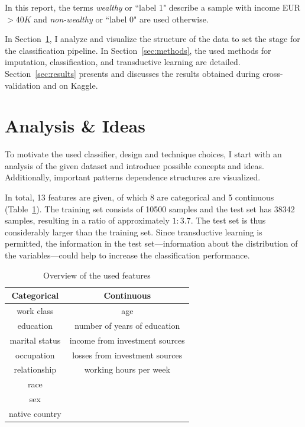 \documentclass{article}
\begin{document}
In this report, the terms \emph{wealthy} or ``label 1" describe a sample with income EUR $>40K$ and \emph{non-wealthy} or ``label 0" are used otherwise.

In Section~\ref{sec:analysis}, I analyze and visualize
the structure of the data to set the stage for the classification pipeline. In
Section~\ref{sec:methods}, the used methods for imputation, classification, and transductive learning are detailed. Section~\ref{sec:results} presents and discusses the results obtained during cross-validation and on
Kaggle.

\section{Analysis \& Ideas}
\label{sec:analysis}

To motivate the used classifier, design and technique
choices, I start with an analysis of the given dataset and introduce possible concepts and ideas. Additionally, important patterns dependence structures are visualized.

In total, 13 features are given, of which 8 are categorical and 5 continuous (Table~\ref{tab:features}).
The training set consists of 10500 samples and the test set has 38342 samples, resulting in a ratio of approximately $1:3.7$.
The test set is thus considerably larger than the training set.
Since transductive learning is permitted, the information in the test set---information about the distribution of the variables---could help to increase the classification performance.

\begin{table}[h]
  \centering
  \begin{tabular}{cc}
    \toprule
  Categorical  & Continuous                     \\
    \midrule
    work class & age                            \\
    education  & number of years of education   \\
marital status & income from investment sources \\
occupation     & losses from investment sources \\
relationship   & working hours per week         \\
race           &                                \\
sex            &                                \\
native country &                                \\
      \bottomrule
  \end{tabular}
  \caption{{Overview of the used features}}
  \label{tab:features}

\end{table}
\end{document}
